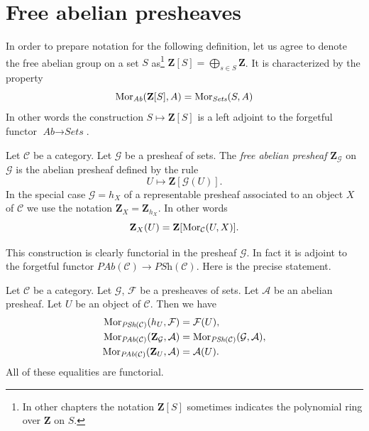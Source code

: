 \section{Free abelian presheaves}
\label{section-free-abelian-presheaf}

\noindent
In order to prepare notation for the following definition, let us agree
to denote the free abelian group on a set $S$ as\footnote{In other chapters
the notation $\mathbf{Z}[S]$ sometimes indicates the polynomial ring over
$\mathbf{Z}$ on $S$.}
$\mathbf{Z}[S] = \bigoplus_{s \in S} \mathbf{Z}$. It is characterized
by the property
$$
\mathop{\mathrm{Mor}}\nolimits_{\textit{Ab}}(\mathbf{Z}[S], A)
=
\mathop{\mathrm{Mor}}\nolimits_{\textit{Sets}}(S, A)
$$
In other words the construction $S \mapsto \mathbf{Z}[S]$ is a left adjoint
to the forgetful functor $\textit{Ab} \to \textit{Sets}$.

\begin{definition}
\label{definition-free-abelian-presheaf-on}
Let $\mathcal{C}$ be a category. Let $\mathcal{G}$ be a presheaf of sets.
The {\it free abelian presheaf} $\mathbf{Z}_\mathcal{G}$ on $\mathcal{G}$
is the abelian presheaf defined by the rule
$$
U \longmapsto \mathbf{Z}[\mathcal{G}(U)].
$$
In the special case $\mathcal{G} = h_X$ of a representable presheaf
associated to an object $X$ of $\mathcal{C}$
we use the notation $\mathbf{Z}_X = \mathbf{Z}_{h_X}$. In other words
$$
\mathbf{Z}_X(U) = \mathbf{Z}[\mathop{\mathrm{Mor}}\nolimits_\mathcal{C}(U, X)].
$$
\end{definition}

\noindent
This construction is clearly functorial in the presheaf $\mathcal{G}$.
In fact it is adjoint to the forgetful functor
$\textit{PAb}(\mathcal{C}) \to \textit{PSh}(\mathcal{C})$.
Here is the precise statement.

\begin{lemma}
\label{lemma-obvious-adjointness}
Let $\mathcal{C}$ be a category.
Let $\mathcal{G}$, $\mathcal{F}$ be a presheaves of sets.
Let $\mathcal{A}$ be an abelian presheaf.
Let $U$ be an object of $\mathcal{C}$. Then
we have
\begin{align*}
\mathop{\mathrm{Mor}}\nolimits_{\textit{PSh}(\mathcal{C})}(h_U, \mathcal{F})
& =
\mathcal{F}(U), \\
\mathop{\mathrm{Mor}}\nolimits_{\textit{PAb}(\mathcal{C})}(\mathbf{Z}_\mathcal{G}, \mathcal{A})
& =
\mathop{\mathrm{Mor}}\nolimits_{\textit{PSh}(\mathcal{C})}(\mathcal{G}, \mathcal{A}), \\
\mathop{\mathrm{Mor}}\nolimits_{\textit{PAb}(\mathcal{C})}(\mathbf{Z}_U, \mathcal{A})
& =
\mathcal{A}(U).
\end{align*}
All of these equalities are functorial.
\end{lemma}

